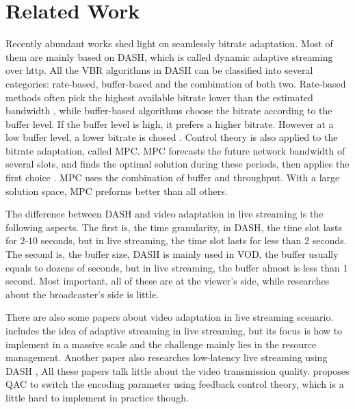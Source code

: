 \section{Related Work}
Recently abundant works shed light on seamlessly bitrate adaptation. Most of them are mainly based on DASH, which is called dynamic adaptive streaming over http. All the VBR algorithms in DASH can be classified into several categories: rate-based, buffer-based and the combination of both two. Rate-based methods often pick the highest available bitrate lower than the estimated bandwidth \cite{jiang2014improving}, while buffer-based algorithms choose the bitrate according to the buffer level. If the buffer level is high, it prefers a higher bitrate. However at a low buffer level, a lower bitrate is chosed \cite{huang2003adaptive}. Control theory is also applied to the bitrate adaptation, called MPC. MPC forecasts the future network bandwidth of several slots, and finds the optimal solution during these periods, then applies the first choice \cite{yin2015control}. MPC uses the combination of buffer and throughput. With a large solution space, MPC preforms better than all others.

The difference between DASH and video adaptation in live streaming is the following aspects. The first is, the time granularity, in DASH, the time slot lasts for $2$-$10$ seconds, but in live streaming, the time slot lasts for less than $2$ seconds. The second is, the buffer size, DASH is mainly used in VOD, the buffer usually equals to dozens of seconds, but in live streaming, the buffer almost is less than $1$ second. Most important, all of these are at the viewer's side, while researches about the broadcaster's side is little.

There are also some papers about video adaptation in live streaming scenario. \cite{pires2014dash} includes the idea of adaptive streaming in live streaming, but its focus is how to implement in a massive scale and the challenge mainly lies in the resource management. Another paper also researches low-latency live streaming using DASH \cite{bouzakaria2014overhead}, All these papers talk little about the video transmission quality. \cite{de2011feedback} proposes QAC to switch the encoding parameter using feedback control theory, which is a little hard to implement in practice though.
